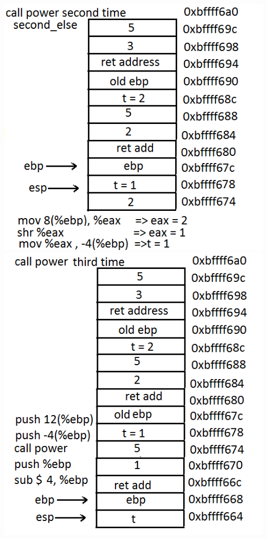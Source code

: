 \documentclass{article}
\begin{document}
\includegraphics[scale=0.5]{stack10.png}\\
\includegraphics[scale=0.5]{stack11.png}
\end{document}
